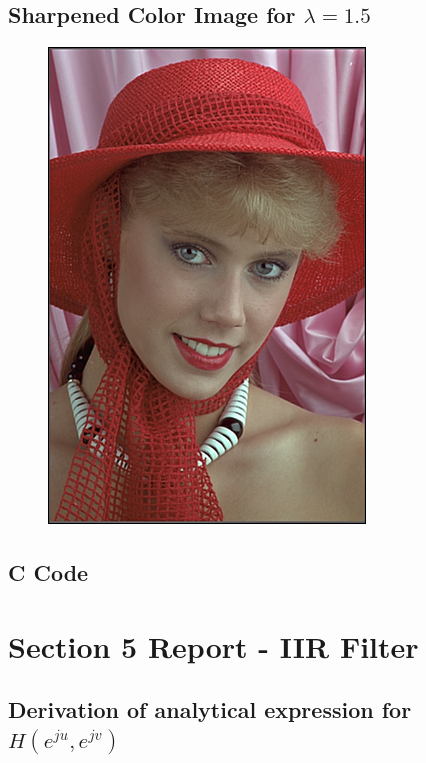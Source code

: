 \documentclass{article}
\begin{document}
\subsection{Sharpened Color Image for $\lambda = 1.5$}
\begin{figure}[H]
    \centering
    \includegraphics[width=0.75\textwidth]{../results/sharpened.png}
    \begin{center}
    \end{center}
\end{figure}
\subsection{C Code}


\section{Section 5 Report - IIR Filter}
\subsection{Derivation of analytical expression for $H(e^{ju}, e^{jv})$}
\end{document}
